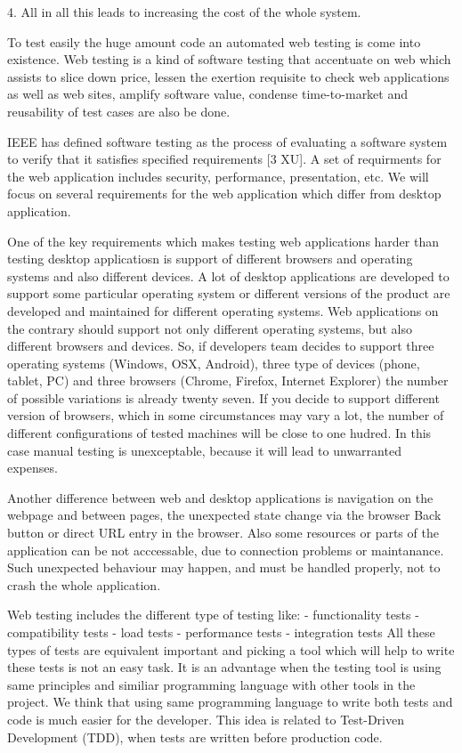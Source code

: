 \documentclass{article}
\begin{document}
		4. All in all this leads to increasing the cost of the whole system.
	 	
	 	To test easily the huge amount code an automated web testing is come into existence.
	 	 Web testing is a kind of software testing that accentuate on web which assists to slice down price,
	  lessen the exertion requisite to check web applications as well as web sites, amplify software value,
	   condense time-to-market and reusability of test cases are also be done. 
	   
		IEEE has defined software testing as the process of evaluating a software
		system to verify that it satisfies specified requirements [3 XU]. A set of
		requirments for the web application includes security, performance,
		presentation, etc. We will focus on several requirements for the web
		application which differ from desktop application. 
		
		One of the key requirements which makes testing web applications harder than
		testing desktop applicatiosn is support of different browsers and operating systems and also
		different devices. A lot of desktop applications are developed to support some
		particular operating system or different versions of the product are developed
		and maintained for different operating systems. Web applications on the
		contrary should support not only different operating systems, but also
		different browsers and devices. So, if developers team decides to support
		three operating systems (Windows, OSX, Android), three type of devices (phone,
		tablet, PC) and three browsers (Chrome, Firefox, Internet Explorer) the number
		of possible variations is already twenty seven. If you decide to support
		different version of browsers, which in some circumstances may vary a lot,
		the number of different configurations of tested machines will be close to
		one hudred. In this case manual testing is unexceptable, because it will lead
		to unwarranted expenses. 
		
		Another difference between web and desktop applications is
		navigation on the webpage and between pages, the unexpected state change via
		the browser Back button or direct URL entry in the browser. Also some
		resources or parts of the application can be not acccessable, due to
		connection problems or maintanance. Such unexpected behaviour may happen, and
		must be handled properly, not to crash the whole application.

		Web testing includes the different type of testing like:
			- functionality tests
			- compatibility tests
			- load tests
			- performance tests
			- integration tests
		All these types of tests are equivalent important and picking a tool which
		will help to write these tests is not an easy task. It is an advantage when
		the testing tool is using same principles and similiar programming language
		with other tools in the project. We think that using same programming language
		to write both tests and code is much easier for the developer. This idea is
		related to Test-Driven Development (TDD), when tests are written
		before production code.
		
\end{document}
